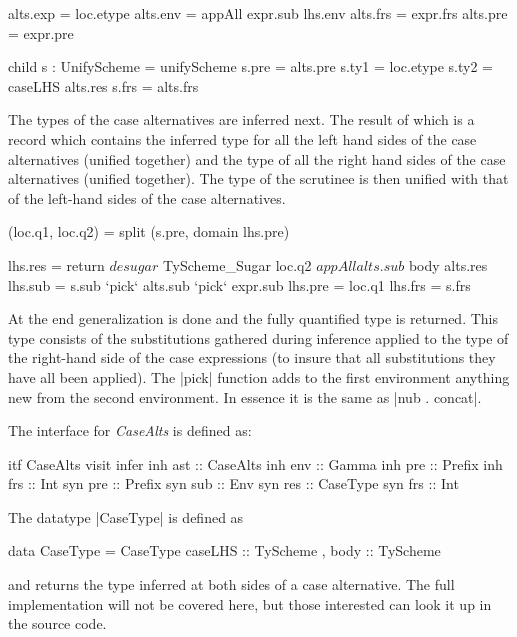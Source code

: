 \begin{code}
   alts.exp  = loc.etype
   alts.env  = appAll expr.sub lhs.env
   alts.frs  = expr.frs
   alts.pre  = expr.pre
   
   child s : UnifyScheme = unifyScheme
   s.pre  = alts.pre
   s.ty1  = loc.etype
   s.ty2  = caseLHS alts.res
   s.frs  = alts.frs
\end{code}

The types of the case alternatives are inferred next. The result of which is a record which contains the inferred type for all the left hand sides of the case alternatives (unified together) and the type of all the right hand sides of the case alternatives (unified together). The type of the scrutinee is then unified with that of the left-hand sides of the case alternatives.

\begin{code}       
   (loc.q1, loc.q2) = split (s.pre, domain lhs.pre)
   
   lhs.res = return  $ desugar 
                     $ TyScheme_Sugar loc.q2 
                     $ appAll alts.sub 
                     $ body alts.res
   lhs.sub  = s.sub `pick` alts.sub `pick` expr.sub
   lhs.pre  = loc.q1
   lhs.frs  = s.frs
\end{code}
At the end generalization is done and the fully quantified type is returned. This type consists of the substitutions gathered during inference applied to the type of the right-hand side of the case expressions (to insure that all substitutions they have all been applied). The |pick| function adds to the first environment anything new from the second environment. In essence it is the same as |nub . concat|.

The interface for \emph{CaseAlts} is defined as:
\begin{code}
itf CaseAlts
  visit infer
    inh ast  :: CaseAlts
    inh env  :: Gamma
    inh pre  :: Prefix
    inh frs  :: Int
    syn pre  :: Prefix
    syn sub  :: Env
    syn res  :: CaseType
    syn frs  :: Int 
\end{code}

The datatype |CaseType| is defined as 

\begin{code}
data CaseType = CaseType  
         {  caseLHS  ::  TyScheme
         ,  body     ::  TyScheme
         }
\end{code}

and returns the type inferred at both sides of a case alternative.
The full implementation will not be covered here, but those interested can look it up in the source code.


